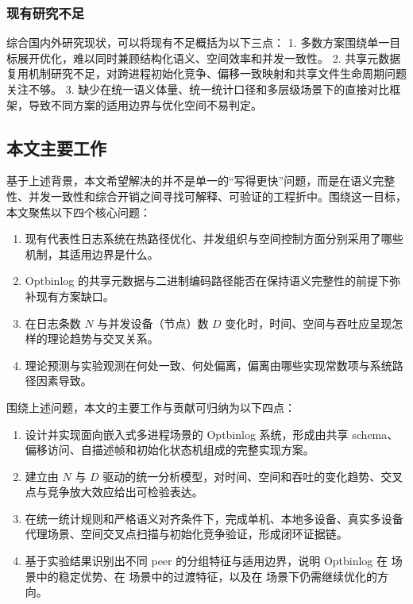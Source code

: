 \subsubsection{现有研究不足}\label{ux73b0ux6709ux7814ux7a76ux4e0dux8db3}

综合国内外研究现状，可以将现有不足概括为以下三点： 1. 多数方案围绕单一目标展开优化，难以同时兼顾结构化语义、空间效率和并发一致性。 2. 共享元数据复用机制研究不足，对跨进程初始化竞争、偏移一致映射和共享文件生命周期问题关注不够。 3. 缺少在统一语义体量、统一统计口径和多层级场景下的直接对比框架，导致不同方案的适用边界与优化空间不易判定。

\subsection{本文主要工作}\label{ux672cux6587ux4e3bux8981ux5de5ux4f5c}

基于上述背景，本文希望解决的并不是单一的``写得更快''问题，而是在语义完整性、并发一致性和综合开销之间寻找可解释、可验证的工程折中。围绕这一目标，本文聚焦以下四个核心问题：

\begin{enumerate}
\def\labelenumi{\arabic{enumi}.}
\tightlist
\item
  现有代表性日志系统在热路径优化、并发组织与空间控制方面分别采用了哪些机制，其适用边界是什么。
\item
  Optbinlog 的共享元数据与二进制编码路径能否在保持语义完整性的前提下弥补现有方案缺口。
\item
  在日志条数 \(N\) 与并发设备（节点）数 \(D\) 变化时，时间、空间与吞吐应呈现怎样的理论趋势与交叉关系。
\item
  理论预测与实验观测在何处一致、何处偏离，偏离由哪些实现常数项与系统路径因素导致。
\end{enumerate}

围绕上述问题，本文的主要工作与贡献可归纳为以下四点：

\begin{enumerate}
\def\labelenumi{\arabic{enumi}.}
\tightlist
\item
  设计并实现面向嵌入式多进程场景的 Optbinlog 系统，形成由共享 schema、偏移访问、自描述帧和初始化状态机组成的完整实现方案。
\item
  建立由 \(N\) 与 \(D\) 驱动的统一分析模型，对时间、空间和吞吐的变化趋势、交叉点与竞争放大效应给出可检验表达。
\item
  在统一统计规则和严格语义对齐条件下，完成单机、本地多设备、真实多设备代理场景、空间交叉点扫描与初始化竞争验证，形成闭环证据链。
\item
  基于实验结果识别出不同 peer 的分组特征与适用边界，说明 Optbinlog 在  场景中的稳定优势、在  场景中的过渡特征，以及在  场景下仍需继续优化的方向。
\end{enumerate}

